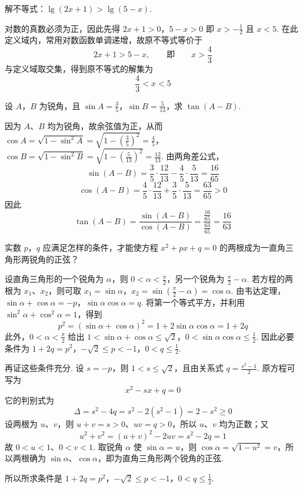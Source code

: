 \begin{problem}
解不等式：\( \lg \left( 2x+1 \right)>\lg \left( 5-x \right) \).
\end{problem}

\begin{solution}
对数的真数必须为正，因此先得
\(2x+1>0\)，\(5-x>0\)
即 \(x>-\frac{1}{2}\) 且 \(x<5\). 在此定义域内，常用对数函数单调递增，故原不等式等价于
\[
2x+1>5-x,\qquad\text{即}\qquad x>\frac{4}{3}
\]
与定义域取交集，得到原不等式的解集为
\[
\frac{4}{3}<x<5
\]
\end{solution}

\begin{problem}
设 \(A\)，\(B\) 为锐角，且 \( \sin A=\frac{3}{5} \)，\( \sin B=\frac{5}{13} \)，求 \( \tan\left( A-B \right) \).
\end{problem}

\begin{solution}
因为 \(A\)、\(B\) 均为锐角，故余弦值为正，从而
\(\cos A=\sqrt{1-\sin^2A}=\sqrt{1-\left(\frac{3}{5}\right)^2}=\frac{4}{5}\)，\(\cos B=\sqrt{1-\sin^2B}=\sqrt{1-\left(\frac{5}{13}\right)^2}=\frac{12}{13}\).
由两角差公式，
\[
\sin(A-B)=\frac{3}{5}\cdot\frac{12}{13}-\frac{4}{5}\cdot\frac{5}{13}=\frac{16}{65}
\]
\[
\cos(A-B)=\frac{4}{5}\cdot\frac{12}{13}+\frac{3}{5}\cdot\frac{5}{13}=\frac{63}{65}>0
\]
因此
\[
\tan(A-B)=\frac{\sin(A-B)}{\cos(A-B)}=\frac{\frac{16}{65}}{\frac{63}{65}}=\frac{16}{63}
\]
\end{solution}

\begin{problem}
实数 \( p \)，\( q \) 应满足怎样的条件，才能使方程 \( x^2+px+q=0 \) 的两根成为一直角三角形两锐角的正弦？
\end{problem}

\begin{solution}
设直角三角形的一个锐角为 \(\alpha\)，则 \(0<\alpha<\frac{\pi}{2}\)，另一个锐角为 \(\frac{\pi}{2}-\alpha\). 若方程的两根为 \(x_1\)、\(x_2\)，则可取
\(x_1=\sin\alpha\)，\(x_2=\sin\left(\frac{\pi}{2}-\alpha\right)=\cos\alpha\).
由韦达定理，
\(\sin\alpha+\cos\alpha=-p\)，\(\sin\alpha\cos\alpha=q\).
将第一个等式平方，并利用 \(\sin^2\alpha+\cos^2\alpha=1\)，得到
\[
p^2=\left(\sin\alpha+\cos\alpha\right)^2=1+2\sin\alpha\cos\alpha=1+2q
\]
此外，\(0<\alpha<\frac{\pi}{2}\) 给出
\(1<\sin\alpha+\cos\alpha\leq\sqrt{2}\)，\(0<\sin\alpha\cos\alpha\leq\frac{1}{2}\).
因此必要条件为
\(1+2q=p^2\)，\(-\sqrt{2}\leq p<-1\)，\(0<q\leq\frac{1}{2}\).

再证这些条件充分. 设 \(s=-p\)，则 \(1<s\leq\sqrt{2}\)，且由关系式 \(q=\frac{s^2-1}{2}\). 原方程可写为
\[
x^2-sx+q=0
\]
它的判别式为
\[
\Delta=s^2-4q=s^2-2\left(s^2-1\right)=2-s^2\geq0
\]
设两根为 \(u\)、\(v\)，则 \(u+v=s>0\)、\(uv=q>0\)，所以 \(u\)、\(v\) 均为正数；又
\[
u^2+v^2=(u+v)^2-2uv=s^2-2q=1
\]
故 \(0<u<1\)、\(0<v<1\). 取锐角 \(\alpha\) 使 \(\sin\alpha=u\)，则 \(\cos\alpha=\sqrt{1-u^2}=v\)，所以两根确为 \(\sin\alpha\)、\(\cos\alpha\)，即为直角三角形两个锐角的正弦.

所以所求条件是
\(1+2q=p^2\)，\(-\sqrt{2}\leq p<-1\)，\(0<q\leq\frac{1}{2}\).
\end{solution}

